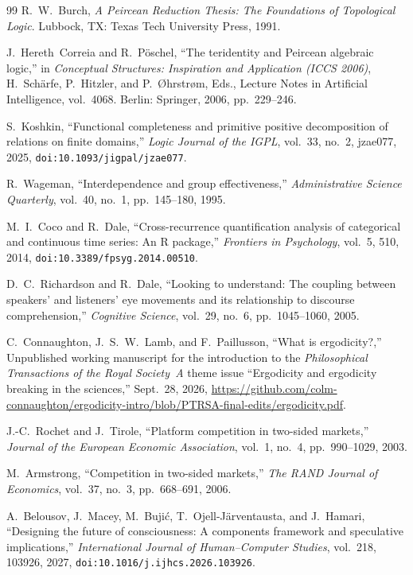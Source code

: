 \documentclass[11pt,a4paper]{article}
\begin{document}
\begin{thebibliography}{99}
R.~W.~Burch,
\emph{A Peircean Reduction Thesis: The Foundations of Topological Logic}.
Lubbock, TX: Texas Tech University Press, 1991.

J.~Hereth~Correia and R.~P\"oschel,
``The teridentity and Peircean algebraic logic,''
in \emph{Conceptual Structures: Inspiration and Application (ICCS 2006)}, H.~Sch\"arfe, P.~Hitzler, and P.~\O{}hrstr\o{}m, Eds., Lecture Notes in Artificial Intelligence, vol.~4068.
Berlin: Springer, 2006, pp.~229--246.

S.~Koshkin,
``Functional completeness and primitive positive decomposition of relations on finite domains,''
\emph{Logic Journal of the IGPL}, vol.~33, no.~2, jzae077, 2025, \texttt{doi:10.1093/jigpal/jzae077}.

R.~Wageman,
``Interdependence and group effectiveness,''
\emph{Administrative Science Quarterly}, vol.~40, no.~1, pp.~145--180, 1995.

M.~I.~Coco and R.~Dale,
``Cross-recurrence quantification analysis of categorical and continuous time series: An R package,''
\emph{Frontiers in Psychology}, vol.~5, 510, 2014, \texttt{doi:10.3389/fpsyg.2014.00510}.

D.~C.~Richardson and R.~Dale,
``Looking to understand: The coupling between speakers' and listeners' eye movements and its relationship to discourse comprehension,''
\emph{Cognitive Science}, vol.~29, no.~6, pp.~1045--1060, 2005.

C.~Connaughton, J.~S.~W.~Lamb, and F.~Paillusson,
``What is ergodicity?,''
Unpublished working manuscript for the introduction to the \emph{Philosophical Transactions of the Royal Society~A} theme issue ``Ergodicity and ergodicity breaking in the sciences,'' Sept.~28, 2026, \url{https://github.com/colm-connaughton/ergodicity-intro/blob/PTRSA-final-edits/ergodicity.pdf}.

J.-C.~Rochet and J.~Tirole,
``Platform competition in two-sided markets,''
\emph{Journal of the European Economic Association}, vol.~1, no.~4, pp.~990--1029, 2003.

M.~Armstrong,
``Competition in two-sided markets,''
\emph{The RAND Journal of Economics}, vol.~37, no.~3, pp.~668--691, 2006.

A.~Belousov, J.~Macey, M.~Buji\'c, T.~Ojell-J\"arventausta, and J.~Hamari,
``Designing the future of consciousness: A components framework and speculative implications,''
\emph{International Journal of Human--Computer Studies}, vol.~218, 103926, 2027, \texttt{doi:10.1016/j.ijhcs.2026.103926}.

\end{thebibliography}
\end{document}
